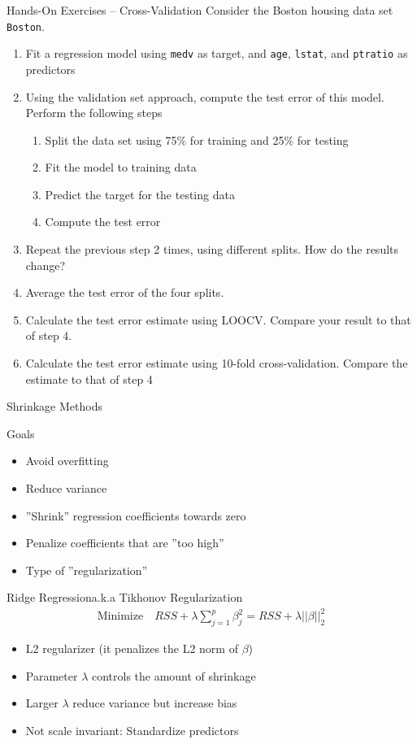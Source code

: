 \documentclass[ignorenonframetext,xcolor=x11names]{beamer}
\begin{document}
\begin{frame}{Hands-On Exercises -- Cross-Validation}
Consider the Boston housing data set \texttt{Boston}.
\begin{enumerate}
  \item Fit a regression model using \texttt{medv} as target, and \texttt{age}, \texttt{lstat}, and \texttt{ptratio} as predictors
  \item Using the validation set approach, compute the test error of this model. Perform the following steps
  \begin{enumerate}
     \item Split the data set using 75\% for training and 25\% for testing
     \item Fit the model to training data
     \item Predict the target for the testing data
     \item Compute the test error
  \end{enumerate}
  \item Repeat the previous step 2 times, using different splits. How do the results change?
  \item Average the test error of the four splits. 
  \item Calculate the test error estimate using LOOCV. Compare your result to that of step 4.
  \item Calculate the test error estimate using 10-fold cross-validation. Compare the estimate to that of step 4
\end{enumerate}
\end{frame}

\begin{frame}{Shrinkage Methods}
\begin{block}{Goals}
\begin{itemize}
   \item Avoid overfitting
   \item Reduce variance
   \item ''Shrink'' regression coefficients towards zero
   \item Penalize coefficients that are ''too high''
   \item Type of ''regularization''
\end{itemize}
\end{block}
\end{frame}


\begin{frame}{Ridge Regression}{a.k.a Tikhonov Regularization}
\begin{align*}
\text{Minimize} \quad RSS + \lambda \sum_{j=1}^p \beta_j^2 = RSS + \lambda ||\beta||_2^2
\end{align*}
\begin{itemize}
   \item L2 regularizer (it penalizes the L2 norm of $\beta$)
   \item Parameter $\lambda$ controls the amount of shrinkage
   \item Larger $\lambda$ reduce variance but increase bias
   \item Not scale invariant: Standardize predictors
\end{itemize}
\end{frame}
\end{document}
